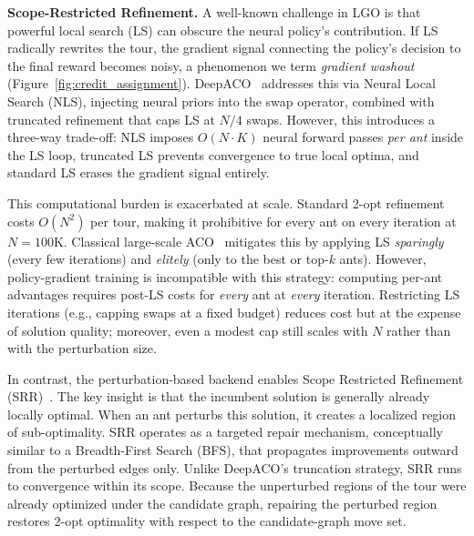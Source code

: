 \documentclass[sigconf,review]{acmart}
\begin{document}
\smallskip\noindent\textbf{Scope-Restricted Refinement.}
\label{sec:localized-ls}
A well-known challenge in LGO is that powerful local search (LS) can obscure the neural policy's contribution.
If LS radically rewrites the tour, the gradient signal connecting the policy's decision to the final reward becomes noisy, a phenomenon we term \emph{gradient washout} (Figure~\ref{fig:credit_assignment}).
DeepACO~\cite{deepaco} addresses this via Neural Local Search (NLS), injecting neural priors into the swap operator, combined with truncated refinement that caps LS at $N/4$ swaps.
However, this introduces a three-way trade-off: NLS imposes $O(N{\cdot}K)$ neural forward passes \emph{per ant} inside the LS loop, truncated LS prevents convergence to true local optima, and standard LS erases the gradient signal entirely.

This computational burden is exacerbated at scale.
Standard 2-opt refinement costs $O(N^2)$ per tour, making it prohibitive for every ant on every iteration at $N{=}100$K.
Classical large-scale ACO~\citep{partialACO, P-ACO} mitigates this by applying LS \emph{sparingly} (every few iterations) and \emph{elitely} (only to the best or top-$k$ ants).
However, policy-gradient training is incompatible with this strategy: computing per-ant advantages requires post-LS costs for \emph{every} ant at \emph{every} iteration.
Restricting LS iterations (e.g., capping swaps at a fixed budget) reduces cost but at the expense of solution quality; moreover, even a modest cap still scales with $N$ rather than with the perturbation size.

In contrast, the perturbation-based backend enables Scope Restricted Refinement (SRR)~\cite{faco}.
The key insight is that the incumbent solution is generally already locally optimal.
When an ant perturbs this solution, it creates a localized region of sub-optimality.
SRR operates as a targeted repair mechanism, conceptually similar to a Breadth-First Search (BFS), that propagates improvements outward from the perturbed edges only.
Unlike DeepACO's truncation strategy, SRR runs to convergence within its scope.
Because the unperturbed regions of the tour were already optimized under the candidate graph, repairing the perturbed region restores 2-opt optimality with respect to the candidate-graph move set.
\end{document}
